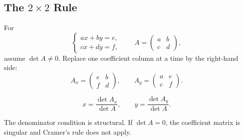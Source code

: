 \subsection{The $2\times2$ Rule}

For
\[
\begin{cases}
ax+by=e,\\
cx+dy=f,
\end{cases}
\qquad
A=\begin{pmatrix}a&b\\c&d\end{pmatrix},
\]
assume $\det A\neq0$. Replace one coefficient column at a time by the right-hand side:
\[
A_x=\begin{pmatrix}e&b\\f&d\end{pmatrix},
\qquad
A_y=\begin{pmatrix}a&e\\c&f\end{pmatrix}.
\]

\begin{theorembox}
\[
\boxed{x=\frac{\det A_x}{\det A},
\qquad
y=\frac{\det A_y}{\det A}}.
\]
\end{theorembox}

\begin{remarkbox}
The denominator condition is structural. If $\det A=0$, the coefficient matrix is singular and Cramer's rule does not apply.
\end{remarkbox}
